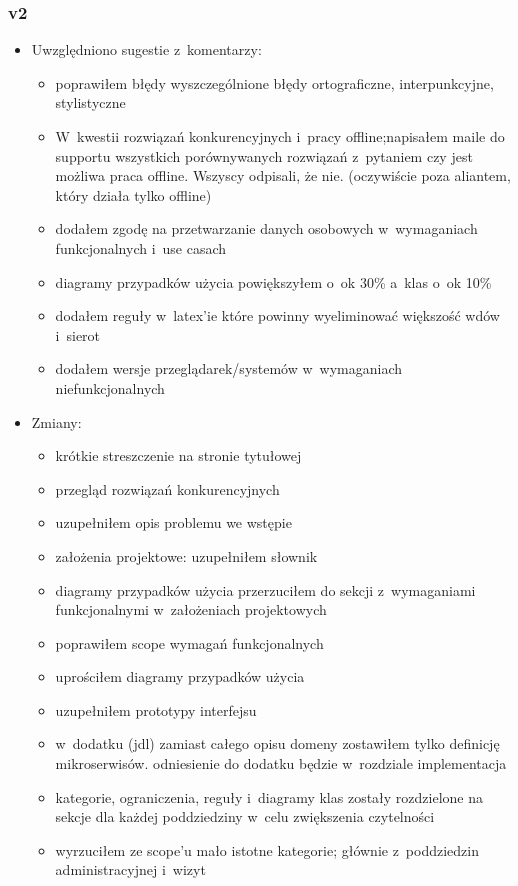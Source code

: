 \subsubsection{v2}
\begin{itemize}
\item Uwzględniono sugestie z~komentarzy:
    \begin{itemize}
	\item poprawiłem błędy wyszczególnione błędy ortograficzne, interpunkcyjne, stylistyczne
	\item W~kwestii rozwiązań konkurencyjnych i~pracy offline;napisałem maile do supportu wszystkich porównywanych rozwiązań z~pytaniem czy jest możliwa praca offline. Wszyscy odpisali, że nie. (oczywiście poza aliantem, który działa tylko offline)
	\item dodałem zgodę na przetwarzanie danych osobowych w~wymaganiach funkcjonalnych i~use casach
	\item diagramy przypadków użycia powiększyłem o~ok 30\% a~klas o~ok 10\%
	\item dodałem reguły w~latex'ie które powinny wyeliminować większość wdów i~sierot
	\item dodałem wersje przeglądarek/systemów w~wymaganiach niefunkcjonalnych
	\end{itemize}
\item Zmiany:
    \begin{itemize}
	\item krótkie streszczenie na stronie tytułowej
	\item przegląd rozwiązań konkurencyjnych
	\item uzupełniłem opis problemu we wstępie
	\item założenia projektowe: uzupełniłem słownik
	\item diagramy przypadków użycia przerzuciłem do sekcji z~wymaganiami funkcjonalnymi w~założeniach projektowych
	\item poprawiłem scope wymagań funkcjonalnych
	\item uprościłem diagramy przypadków użycia
	\item uzupełniłem prototypy interfejsu
	\item w~dodatku (jdl) zamiast całego opisu domeny zostawiłem tylko definicję mikroserwisów. odniesienie do dodatku będzie w~rozdziale implementacja
	\item kategorie, ograniczenia, reguły i~diagramy klas zostały rozdzielone na sekcje dla każdej poddziedziny w~celu zwiększenia czytelności
	\item wyrzuciłem ze scope'u mało istotne kategorie; głównie z~poddziedzin administracyjnej i~wizyt

\end{itemize}
\end{itemize}
